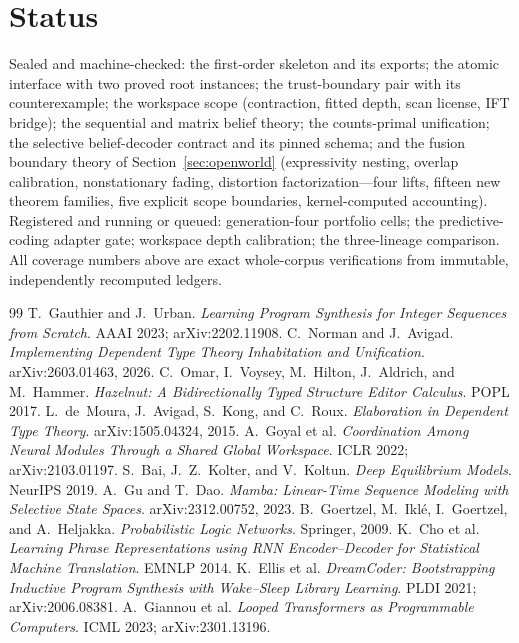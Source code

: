 \documentclass[11pt]{article}
\begin{document}
\section*{Status}

Sealed and machine-checked: the first-order skeleton and its exports; the atomic
interface with two proved root instances; the trust-boundary pair with its
counterexample; the workspace scope (contraction, fitted depth, scan license, IFT
bridge); the sequential and matrix belief theory; the counts-primal unification; the
selective belief-decoder contract and its pinned schema; and the fusion boundary theory
of Section~\ref{sec:openworld} (expressivity nesting, overlap calibration,
nonstationary fading, distortion factorization---four lifts, fifteen new theorem
families, five explicit scope boundaries, kernel-computed accounting). Registered and
running or queued: generation-four portfolio cells; the predictive-coding adapter gate;
workspace depth calibration; the three-lineage comparison. All coverage numbers above are exact whole-corpus
verifications from immutable, independently recomputed ledgers.

\begin{thebibliography}{99}
 T.~Gauthier and J.~Urban.
  \emph{Learning Program Synthesis for Integer Sequences from Scratch}.
  AAAI 2023; arXiv:2202.11908.
 C.~Norman and J.~Avigad.
  \emph{Implementing Dependent Type Theory Inhabitation and Unification}.
  arXiv:2603.01463, 2026.
 C.~Omar, I.~Voysey, M.~Hilton, J.~Aldrich, and M.~Hammer.
  \emph{Hazelnut: A Bidirectionally Typed Structure Editor Calculus}. POPL 2017.
 L.~de~Moura, J.~Avigad, S.~Kong, and C.~Roux.
  \emph{Elaboration in Dependent Type Theory}. arXiv:1505.04324, 2015.
 A.~Goyal et al.
  \emph{Coordination Among Neural Modules Through a Shared Global Workspace}.
  ICLR 2022; arXiv:2103.01197.
 S.~Bai, J.~Z.~Kolter, and V.~Koltun.
  \emph{Deep Equilibrium Models}. NeurIPS 2019.
 A.~Gu and T.~Dao.
  \emph{Mamba: Linear-Time Sequence Modeling with Selective State Spaces}.
  arXiv:2312.00752, 2023.
 B.~Goertzel, M.~Ikl\'e, I.~Goertzel, and A.~Heljakka.
  \emph{Probabilistic Logic Networks}. Springer, 2009.
 K.~Cho et al.
  \emph{Learning Phrase Representations using RNN Encoder--Decoder for Statistical
  Machine Translation}. EMNLP 2014.
 K.~Ellis et al.
  \emph{DreamCoder: Bootstrapping Inductive Program Synthesis with Wake--Sleep Library
  Learning}. PLDI 2021; arXiv:2006.08381.
 A.~Giannou et al.
  \emph{Looped Transformers as Programmable Computers}. ICML 2023; arXiv:2301.13196.
\end{thebibliography}
\end{document}
